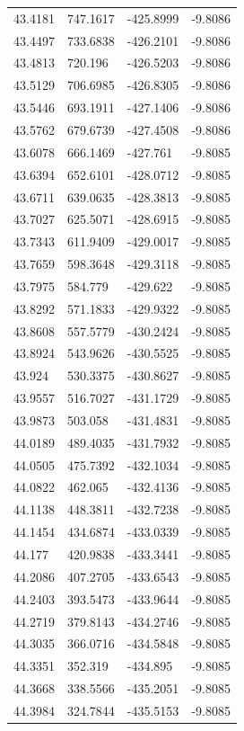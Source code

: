 \begin{table}[H]
\begin{tabular}{llll}
43.4181 & 747.1617 & -425.8999 & -9.8086 \\
43.4497 & 733.6838 & -426.2101 & -9.8086 \\
43.4813 & 720.196 & -426.5203 & -9.8086 \\
43.5129 & 706.6985 & -426.8305 & -9.8086 \\
43.5446 & 693.1911 & -427.1406 & -9.8086 \\
43.5762 & 679.6739 & -427.4508 & -9.8086 \\
43.6078 & 666.1469 & -427.761 & -9.8085 \\
43.6394 & 652.6101 & -428.0712 & -9.8085 \\
43.6711 & 639.0635 & -428.3813 & -9.8085 \\
43.7027 & 625.5071 & -428.6915 & -9.8085 \\
43.7343 & 611.9409 & -429.0017 & -9.8085 \\
43.7659 & 598.3648 & -429.3118 & -9.8085 \\
43.7975 & 584.779 & -429.622 & -9.8085 \\
43.8292 & 571.1833 & -429.9322 & -9.8085 \\
43.8608 & 557.5779 & -430.2424 & -9.8085 \\
43.8924 & 543.9626 & -430.5525 & -9.8085 \\
43.924 & 530.3375 & -430.8627 & -9.8085 \\
43.9557 & 516.7027 & -431.1729 & -9.8085 \\
43.9873 & 503.058 & -431.4831 & -9.8085 \\
44.0189 & 489.4035 & -431.7932 & -9.8085 \\
44.0505 & 475.7392 & -432.1034 & -9.8085 \\
44.0822 & 462.065 & -432.4136 & -9.8085 \\
44.1138 & 448.3811 & -432.7238 & -9.8085 \\
44.1454 & 434.6874 & -433.0339 & -9.8085 \\
44.177 & 420.9838 & -433.3441 & -9.8085 \\
44.2086 & 407.2705 & -433.6543 & -9.8085 \\
44.2403 & 393.5473 & -433.9644 & -9.8085 \\
44.2719 & 379.8143 & -434.2746 & -9.8085 \\
44.3035 & 366.0716 & -434.5848 & -9.8085 \\
44.3351 & 352.319 & -434.895 & -9.8085 \\
44.3668 & 338.5566 & -435.2051 & -9.8085 \\
44.3984 & 324.7844 & -435.5153 & -9.8085 \\

\end{tabular}
\end{table}
